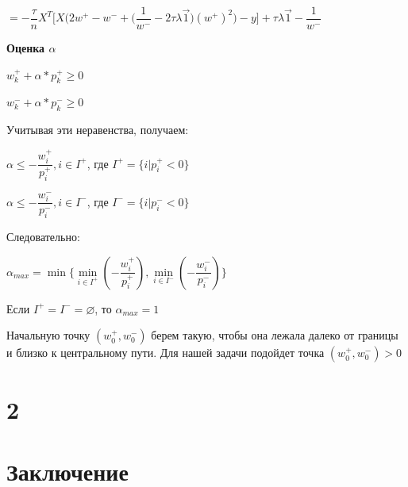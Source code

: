 \documentclass[12pt, a4paper]{article}
\begin{document}
    $= -\dfrac{\tau}{n} X^T \Big[ X\Big( 2w^+ - w^- + \Big(\dfrac{1}{w^-} - 2\tau\lambda\vec{1}\Big) (w^+)^2 \Big) -y \Big] + \tau\lambda\vec{1} - \dfrac{1}{w^-}$

    \medskip
    \textbf{Оценка $\alpha$}

    $w_k^+ + \alpha * p_k^+ \geq 0$

    $w_k^- + \alpha * p_k^- \geq 0$

    Учитывая эти неравенства, получаем:

    $\alpha \leq -\dfrac{w_i^+}{p_i^+}, i \in I^+$, где $I^+ = \{i | p_i^+ < 0\}$

    $\alpha \leq -\dfrac{w_i^-}{p_i^-}, i \in I^-$, где $I^- = \{i | p_i^- < 0\}$

    Следовательно:

    $\alpha_{max} = \min \{\min\limits_{i \in I^+} (-\dfrac{w_i^+}{p_i^+}), \min\limits_{i \in I^-} (-\dfrac{w_i^-}{p_i^-})\}$

    Если $I^+ = I^- = \varnothing$, то $\alpha_{max} = 1$

    \medskip

    Начальную точку $(w_0^+, w_0^-)$ берем такую, чтобы она лежала далеко от границы и близко к центральному пути. Для нашей задачи подойдет точка $(w_0^+, w_0^-) > 0$

    \section{2}

    \section{Заключение}
\end{document}
